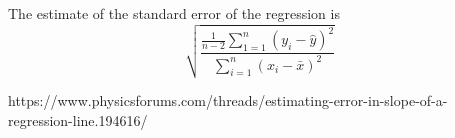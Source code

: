 \documentclass{article}
\begin{document}
The estimate of the standard error of the regression is 
\begin{equation}
\sqrt{\frac{\frac{1}{n-2} \sum_{1=1}^n (y_i - \hat{y})^2}{\sum_{i = 1}^n(x_i-\bar{x})^2}}
\end{equation}

https://www.physicsforums.com/threads/estimating-error-in-slope-of-a-regression-line.194616/
\end{document}
